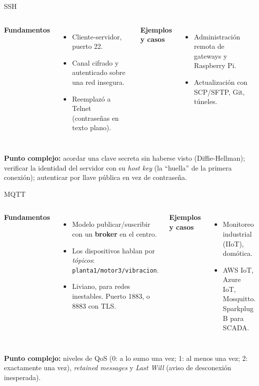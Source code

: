 \documentclass[aspectratio=169,11pt]{beamer}
\newcommand{\complejo}[1]{{\color{cobre}\textbf{Punto complejo:}} #1}
\begin{document}
\begin{frame}{SSH}
\begin{columns}[T]
\textbf{Fundamentos}
\begin{itemize}\small
  \item Cliente-servidor, puerto 22.
  \item Canal cifrado y autenticado sobre una red insegura.
  \item Reemplazó a Telnet (contraseñas en texto plano).
\end{itemize}
\textbf{Ejemplos y casos}
\begin{itemize}\small
  \item Administración remota de gateways y Raspberry Pi.
  \item Actualización con SCP/SFTP, Git, túneles.
\end{itemize}
\end{columns}
\vspace{0.4em}
\complejo{acordar una clave secreta sin haberse visto (\alert{Diffie-Hellman}); verificar la identidad del servidor con su \emph{host key} (la ``huella'' de la primera conexión); autenticar por llave pública en vez de contraseña.}
\end{frame}

\begin{frame}{MQTT}
\begin{columns}[T]
\textbf{Fundamentos}
\begin{itemize}\small
  \item Modelo \alert{publicar/suscribir} con un \textbf{broker} en el centro.
  \item Los dispositivos hablan por \emph{tópicos}: \texttt{planta1/motor3/vibracion}.
  \item Liviano, para redes inestables. Puerto 1883, o 8883 con TLS.
\end{itemize}
\textbf{Ejemplos y casos}
\begin{itemize}\small
  \item Monitoreo industrial (IIoT), domótica.
  \item AWS IoT, Azure IoT, Mosquitto. Sparkplug B para SCADA.
\end{itemize}
\end{columns}
\vspace{0.4em}
\complejo{niveles de \alert{QoS} (0: a lo sumo una vez; 1: al menos una vez; 2: exactamente una vez), \emph{retained messages} y \emph{Last Will} (aviso de desconexión inesperada).}
\end{frame}
\end{document}
